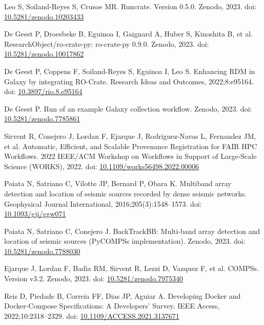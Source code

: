 \documentclass[10pt,letterpaper]{article}
\begin{document}
\begin{thebibliography}{10}
\begin{small}
Leo S, Soiland-Reyes S, Crusoe MR.
Runcrate. Version 0.5.0.
Zenodo, 2023.
doi: \href{https://doi.org/10.5281/zenodo.10203433}{10.5281/zenodo.10203433}

De Geest P, Droesbeke B, Eguinoa I, Gaignard A, Huber S, Kinoshita B, et al.
ResearchObject/ro-crate-py: ro-crate-py 0.9.0.
Zenodo, 2023.
doi: \href{https://doi.org/10.5281/zenodo.10017862}{10.5281/zenodo.10017862}

De Geest P, Coppens F, Soiland-Reyes S, Eguinoa I, Leo S.
Enhancing RDM in Galaxy by integrating RO-Crate.
Research Ideas and Outcomes, 2022;8:e95164.
doi: \href{https://doi.org/10.3897/rio.8.e95164}{10.3897/rio.8.e95164}

De Geest P.
Run of an example Galaxy collection workflow.
Zenodo, 2023.
doi: \href{https://doi.org/10.5281/zenodo.7785861}{10.5281/zenodo.7785861}

Sirvent R, Conejero J, Lordan F, Ejarque J, Rodriguez-Navas L, Fernandez JM, et al.
Automatic, Efficient, and Scalable Provenance Registration for FAIR HPC Workflows.
2022 IEEE/ACM Workshop on Workflows in Support of Large-Scale Science (WORKS), 2022.
doi: \href{https://doi.org/10.1109/works56498.2022.00006}{10.1109/works56498.2022.00006}

Poiata N, Satriano C, Vilotte JP, Bernard P, Obara K.
Multiband array detection and location of seismic sources recorded by dense seismic networks.
Geophysical Journal International, 2016;205(3):1548--1573.
doi: \href{https://doi.org/10.1093/gji/ggw071}{10.1093/gji/ggw071}

Poiata N, Satriano C, Conejero J.
BackTrackBB: Multi-band array detection and location of seismic sources (PyCOMPSs implementation).
Zenodo, 2023.
doi: \href{https://doi.org/10.5281/zenodo.7788030}{10.5281/zenodo.7788030}

Ejarque J, Lordan F, Badia RM, Sirvent R, Lezzi D, Vazquez F, et al.
COMPSs. Version v3.2.
Zenodo, 2023.
doi: \href{https://doi.org/10.5281/zenodo.7975340}{10.5281/zenodo.7975340}

Reis D, Piedade B, Correia FF, Dias JP, Aguiar A.
Developing Docker and Docker-Compose Specifications: A Developers’ Survey.
IEEE Access, 2022;10:2318--2329.
doi: \href{https://doi.org/10.1109/ACCESS.2021.3137671}{10.1109/ACCESS.2021.3137671}


\end{small}
\end{thebibliography}
\end{document}
